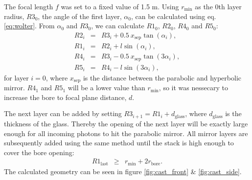 The focal length $f$ was set to a fixed value of 1.5 m. Using $r_{\text{min}}$ as the 0th layer radius, $\mathit{R3}_0$, the angle of the first layer, $\alpha_0$, can be calculated using eq. \ref{eq:wolter}. From $\alpha_0$ and $\mathit{R3}_0$, we can calculate $\mathit{R1}_0$, $\mathit{R2}_0$, $\mathit{R4}_0$ and \ensuremath{\mathit{R5}_0}:
\begin{eqnarray}
  \mathit{R2}_i &=& \mathit{R3}_i + 0.5\ x_{\text{sep}}\tan(\alpha_i),\\
  \mathit{R1}_i &=& \mathit{R2}_i + l\sin(\alpha_i),\\
  \mathit{R4}_i &=& \mathit{R3}_i - 0.5\ x_{\text{sep}}\tan(3\alpha_i),\\
  \mathit{R5}_i &=& \mathit{R4}_i - l\sin(3\alpha_i),
\end{eqnarray}
for layer $i=0$, where $x_{\text{sep}}$ is the distance between the parabolic and hyperbolic mirror. $\mathit{R4}_1$ and $\mathit{R5}_1$ will be a lower value than $r_{\text{min}}$, so it was nessecary to increase the bore to focal plane distance, $d$.

The next layer can be added by setting $\mathit{R3}_{i+1} = \mathit{R1}_i + d_{\text{glass}}$, where $d_{\text{glass}}$ is the thickness of the glass. Thereby the opening of the next layer will be exactly large enough for all incoming photons to hit the parabolic mirror. All mirror layers are subsequently added using the same method until the stack is high enough to cover the bore opening:
\begin{eqnarray}
  \mathit{R1}_{\text{last}} &\geq& r_{\text{min}} + 2r_{\text{bore}}.
\end{eqnarray}
The calculated geometry can be seen in figure \ref{fig:cast_front} \& \ref{fig:cast_side}.

